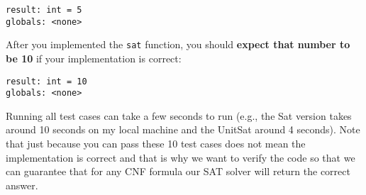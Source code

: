 \documentclass[11pt]{article}
\begin{document}
\begin{lstlisting}
result: int = 5
globals: <none>
\end{lstlisting}

After you implemented the \texttt{sat} function, you should \textbf{expect that number to be 10} if your implementation is correct: 

\begin{lstlisting}
result: int = 10
globals: <none>
\end{lstlisting}

Running all test cases can take a few seconds to run (e.g., the Sat version takes around 10 seconds on my local machine and the UnitSat around 4 seconds). Note that just because you can pass these 10 test cases does not mean the implementation is correct and that is why we want to verify the code so that we can guarantee that for any CNF formula our SAT solver will return the correct answer.
\end{document}
